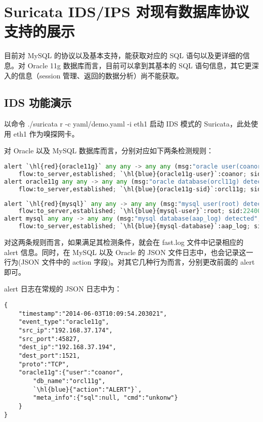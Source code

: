 \section{Suricata IDS/IPS 对现有数据库协议支持的展示}
目前对 MySQL 的协议以及基本支持，能获取对应的 SQL 语句以及更详细的信息。对 Oracle 11g 数据库而言，目前可以拿到其基本的 SQL 语句信息，其它更深入的信息（session 管理、返回的数据分析）尚不能获取。

\subsection{IDS 功能演示}

以命令 {\cf ./suricata r -c yaml/demo.yaml -i eth1} 启动 IDS 模式的 Suricata，此处使用 eth1 作为嗅探网卡。

对 Oracle 以及 MySQL 数据库而言，分别对应如下两条检测规则：

\begin{lstlisting}[language=python]
alert `\hl{red}{oracle11g}` any any -> any any (msg:"oracle user(coanor) detected";
    flow:to_server,established; `\hl{blue}{oracle11g-user}`:coanor; sid:2250000; rev:1;)
alert oracle11g any any -> any any (msg:"oracle database(orcl11g) detected";
    flow:to_server,established; `\hl{blue}{oracle11g-sid}`:orcl11g; sid:2250001; rev:1;)
\end{lstlisting}

\begin{lstlisting}[language=python]
alert `\hl{red}{mysql}` any any -> any any (msg:"mysql user(root) detected";
    flow:to_server,established; `\hl{blue}{mysql-user}`:root; sid:2240000; rev:1;)
alert mysql any any -> any any (msg:"mysql database(aap_log) detected";
    flow:to_server,established; `\hl{blue}{mysql-database}`:aap_log; sid:2240001; rev:1;)
\end{lstlisting}

对这两条规则而言，如果满足其检测条件，就会在 {\ff fast.log} 文件中记录相应的 alert 信息。同时，在 MySQL 以及 Oracle 的 JSON 文件日志中，也会记录这一行为(JSON 文件中的 {\cf action} 字段)。对其它几种行为而言，分别更改前面的 {\cf alert} 即可。

alert 日志在常规的 JSON 日志中为：

\begin{lstlisting}
{
    "timestamp":"2014-06-03T10:09:54.203021",
    "event_type":"oracle11g",
    "src_ip":"192.168.37.174",
    "src_port":45827,
    "dest_ip":"192.168.37.194",
    "dest_port":1521,
    "proto":"TCP",
    "oracle11g":{"user":"coanor",
        "db_name":"orcl11g",
        `\hl{blue}{"action":"ALERT"}`,
        "meta_info":{"sql":null, "cmd":"unkonw"}
    }
}
\end{lstlisting}

